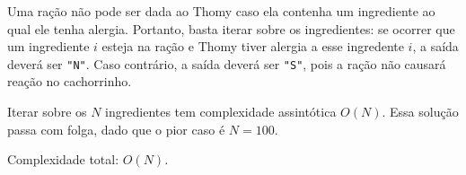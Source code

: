 Uma ração não pode ser dada ao Thomy caso ela contenha um ingrediente ao qual ele tenha alergia. Portanto, basta iterar sobre os ingredientes: se ocorrer que um ingrediente $i$ esteja na ração e Thomy tiver alergia a esse ingredente $i$, a saída deverá ser \texttt{"N"}. Caso contrário, a saída deverá ser \texttt{"S"}, pois a ração não causará reação no cachorrinho.

Iterar sobre os $N$ ingredientes tem complexidade assintótica $O(N)$. Essa solução passa com folga, dado que o pior caso é $N = 100$.

Complexidade total: $O(N)$.
